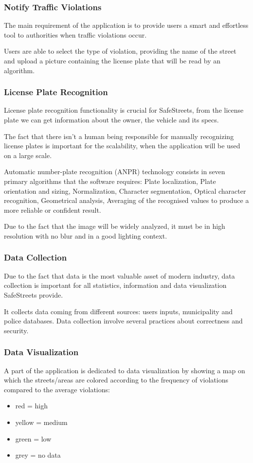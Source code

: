 \subsubsection{Notify Traffic Violations}
The main requirement of the application is to provide users a smart and effortless tool to authorities when traffic violations occur.

Users are able to select the type of violation, providing the name of the street and upload a picture containing the license plate that will be read by an algorithm.

\subsubsection{License Plate Recognition}
License plate recognition functionality is crucial for SafeStreets, from the license plate we can get information about the owner, the vehicle and its specs.

The fact that there isn't a human being responsible for manually recognizing license plates is important for the scalability, when the application will be used on a large scale.

Automatic number-plate recognition (ANPR) technology consists in seven primary algorithms that the software requires: Plate localization, Plate orientation and sizing, Normalization, Character segmentation, Optical character recognition, Geometrical analysis, Averaging of the recognised values to produce a more reliable or confident result.

Due to the fact that the image will be widely analyzed, it must be in high resolution with no blur and in a good lighting context.

\subsubsection{Data Collection}
Due to the fact that data is the most valuable asset of modern industry, data collection is important for all statistics, information and data visualization SafeStreets provide.

It collects data coming from different sources: users inputs, municipality and police databases.
Data collection involve several practices about correctness and security.

\subsubsection{Data Visualization}
A part of the application is dedicated to data visualization by showing a map on which the streets/areas are colored according to the frequency of violations compared to the average violations: 
\begin{itemize}
\item red = high
\item yellow = medium
\item green = low
\item grey = no data
\end{itemize}

